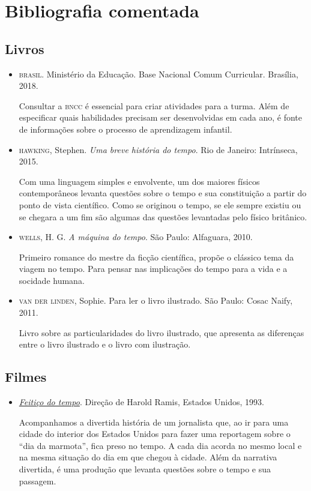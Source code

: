 \documentclass[11pt]{extarticle}
\begin{document}
\section{Bibliografia comentada}

\subsection{Livros}

\begin{itemize}
\item \textsc{brasil}. Ministério da Educação. Base Nacional Comum Curricular. Brasília, 2018.

Consultar a \textsc{bncc} é essencial para criar atividades para a turma. Além de especificar 
quais habilidades precisam ser desenvolvidas em cada ano, é fonte de informações sobre 
o processo de aprendizagem infantil. 

\item \textsc{hawking}, Stephen. \textit{Uma breve história do tempo}. Rio de Janeiro: Intrínseca, 2015.

Com uma linguagem simples e envolvente, um dos maiores físicos contemporâneos levanta questões sobre o tempo e sua constituição a partir do ponto de vista científico. Como se originou o tempo, se ele sempre existiu ou se chegara a um fim são algumas das questões levantadas pelo físico britânico.

\item \textsc{wells}, H. G. \textit{A máquina do tempo}. São Paulo: Alfaguara, 2010.

Primeiro romance do mestre da ficção científica, propõe o clássico tema da viagem no tempo. Para pensar nas implicações do tempo para a vida e a socidade humana.

\item \textsc{van der linden}, Sophie. Para ler o livro ilustrado. São Paulo: Cosac Naify, 2011.

Livro sobre as particularidades do livro ilustrado, que apresenta as diferenças entre o livro ilustrado e o livro com ilustração. 
\end{itemize}

\subsection{Filmes}

\begin{itemize}

\item \href{https://www.adorocinema.com/filmes/filme-8066/}{\textit{Feitiço do tempo}}. Direção de Harold Ramis, Estados Unidos, 1993.

Acompanhamos a divertida história de um jornalista que, ao ir para uma cidade do interior dos Estados Unidos para fazer uma reportagem sobre o ``dia da marmota'', fica preso no tempo. A cada dia acorda no mesmo local e na mesma situação do dia em que chegou à cidade. Além da narrativa divertida, é uma produção que levanta questões sobre o tempo e sua passagem.
\end{itemize}
\end{document}
